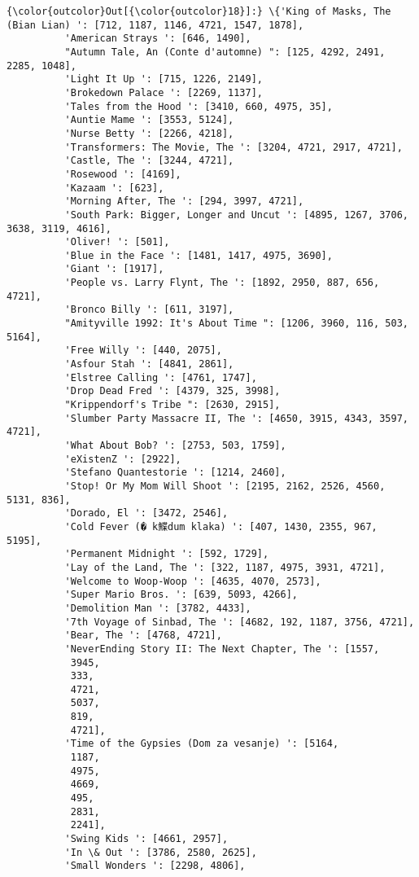 \documentclass[11pt]{article}
\begin{document}
\begin{Verbatim}[commandchars=\\\{\}]
{\color{outcolor}Out[{\color{outcolor}18}]:} \{'King of Masks, The (Bian Lian) ': [712, 1187, 1146, 4721, 1547, 1878],
          'American Strays ': [646, 1490],
          "Autumn Tale, An (Conte d'automne) ": [125, 4292, 2491, 2285, 1048],
          'Light It Up ': [715, 1226, 2149],
          'Brokedown Palace ': [2269, 1137],
          'Tales from the Hood ': [3410, 660, 4975, 35],
          'Auntie Mame ': [3553, 5124],
          'Nurse Betty ': [2266, 4218],
          'Transformers: The Movie, The ': [3204, 4721, 2917, 4721],
          'Castle, The ': [3244, 4721],
          'Rosewood ': [4169],
          'Kazaam ': [623],
          'Morning After, The ': [294, 3997, 4721],
          'South Park: Bigger, Longer and Uncut ': [4895, 1267, 3706, 3638, 3119, 4616],
          'Oliver! ': [501],
          'Blue in the Face ': [1481, 1417, 4975, 3690],
          'Giant ': [1917],
          'People vs. Larry Flynt, The ': [1892, 2950, 887, 656, 4721],
          'Bronco Billy ': [611, 3197],
          "Amityville 1992: It's About Time ": [1206, 3960, 116, 503, 5164],
          'Free Willy ': [440, 2075],
          'Asfour Stah ': [4841, 2861],
          'Elstree Calling ': [4761, 1747],
          'Drop Dead Fred ': [4379, 325, 3998],
          "Krippendorf's Tribe ": [2630, 2915],
          'Slumber Party Massacre II, The ': [4650, 3915, 4343, 3597, 4721],
          'What About Bob? ': [2753, 503, 1759],
          'eXistenZ ': [2922],
          'Stefano Quantestorie ': [1214, 2460],
          'Stop! Or My Mom Will Shoot ': [2195, 2162, 2526, 4560, 5131, 836],
          'Dorado, El ': [3472, 2546],
          'Cold Fever (� k鰈dum klaka) ': [407, 1430, 2355, 967, 5195],
          'Permanent Midnight ': [592, 1729],
          'Lay of the Land, The ': [322, 1187, 4975, 3931, 4721],
          'Welcome to Woop-Woop ': [4635, 4070, 2573],
          'Super Mario Bros. ': [639, 5093, 4266],
          'Demolition Man ': [3782, 4433],
          '7th Voyage of Sinbad, The ': [4682, 192, 1187, 3756, 4721],
          'Bear, The ': [4768, 4721],
          'NeverEnding Story II: The Next Chapter, The ': [1557,
           3945,
           333,
           4721,
           5037,
           819,
           4721],
          'Time of the Gypsies (Dom za vesanje) ': [5164,
           1187,
           4975,
           4669,
           495,
           2831,
           2241],
          'Swing Kids ': [4661, 2957],
          'In \& Out ': [3786, 2580, 2625],
          'Small Wonders ': [2298, 4806],

\end{Verbatim}
\end{document}
